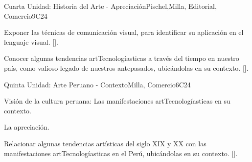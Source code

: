 \begin{syllabus}
\begin{unit}{}{Cuarta Unidad: Historia del Arte - Apreciación}{Pischel,Milla, Editorial, Comercio}{9}{C24}
\begin{learningoutcomes}
	\item Exponer las técnicas de comunicación visual, para identificar su aplicación en el lenguaje visual. [\Usage].
	\item Conocer algunas tendencias artTecnologíasticas a través del tiempo en nuestro país, como valioso legado de nuestros antepasados, ubicándolas en su contexto. [\Usage].
\end{learningoutcomes}
\end{unit}

\begin{unit}{}{Quinta Unidad: Arte Peruano - Contexto}{Milla, Comercio}{6}{C24}
\begin{topics}
	\item Visión de la cultura peruana: Las manifestaciones artTecnologíasticas en su contexto.
	\item La apreciación.
\end{topics}
\begin{learningoutcomes}
	\item Relacionar  algunas tendencias artísticas del siglo XIX y XX con las manifestaciones artTecnologíasticas en el Perú, ubicándolas en su contexto. [\Usage].
\end{learningoutcomes}
\end{unit}



\begin{coursebibliography}
\end{coursebibliography}
\end{syllabus}
